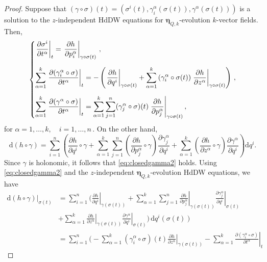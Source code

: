 \documentclass[10pt,a4paper]{amsart}
\newcommand{\dd}{\mathrm{d}}
\newcommand\restr[2]{\left.#1\right|_{#2}} \newcommand{\bfX}{\mathbf{X}} \newcommand{\bfY}{\mathbf{Y}} \newcommand{\bfZ}{\mathbf{Z}} \newcommand{\qeddiamond}{\hfill $\diamond$} \newcommand{\parder}[2]{\frac{\partial #1}{\partial #2}} \newcommand{\dparder}[2]{\dfrac{\partial #1}{\partial #2}} \newcommand{\tparder}[2]{\partial #1/\partial #2} \newcommand{\parderr}[3]{\frac{\partial^2 #1}{\partial #2\partial #3}} \newcommand{\dparderr}[3]{\dfrac{\partial^2 #1}{\partial #2\partial #3}} \newcommand{\tparderr}[3]{\partial^2 #1/\partial #2\partial #3}
\begin{document}
\begin{proof}
Suppose that $(\gamma \circ \sigma)(t) = (\sigma^i(t), \gamma_i^\alpha(\sigma(t)), \gamma^\alpha(\sigma(t)))$ is a solution to the $z$-independent HdDW equations for ${\bm \eta}_{Q,k}$-evolution  $k$-vector fields. Then,
\[
\begin{dcases}
\restr{\dfrac{\partial \sigma^i}{\partial t^\alpha}}{t} = \restr{\dfrac{\partial h}{\partial p_i^\alpha}}{\gamma\circ \sigma(t)}\,,\\[2mm]
\sum_{\alpha=1}^k \restr{\dfrac{\partial(\gamma_i^\alpha\circ \sigma)}{\partial t^\alpha}}{t}
=
-\left( \restr{\dfrac{\partial h}{\partial q^i}}{\gamma\circ \sigma(t)} + \sum_{\alpha=1}^k\left(\gamma_i^\alpha \circ \sigma(t) \right) \restr{\dfrac{\partial h}{\partial z^\alpha}}{\gamma\circ \sigma(t)}\right)\,,  \\[2mm]
\sum_{\alpha=1}^k \restr{\dfrac{\partial(\gamma^\alpha\circ \sigma)}{\partial t^\alpha}}{t}
=
\sum_{\alpha=1}^k\sum_{j=1}^n (\gamma^\alpha_j\circ \sigma)(t) \restr{\dfrac{\partial h}{\partial p_j^\alpha}}{\gamma\circ \sigma(t)},
\end{dcases}
\]
for $\alpha=1,\dotsc,k,\quad i=1,\dotsc,n\,.$ On the other hand,
\[
\dd(h \circ \gamma)
=
\sum_{i=1}^n\left( \frac{\partial h}{\partial q^i} \circ \gamma + \sum_{\alpha=1}^k\sum_{j=1}^n\left( \frac{\partial h}{\partial p_j^\alpha}\circ \gamma \right) \frac{\partial \gamma_j^\alpha}{\partial q^i} + \sum_{\alpha=1}^k\left( \frac{\partial h}{\partial z^\alpha}\circ \gamma \right) \frac{\partial \gamma^\alpha}{\partial q^i} \right) \dd q^i.
\]
Since $\gamma$ is holonomic, it follows that \eqref{eq:closedgamma2} holds.
Using \eqref{eq:closedgamma2} and the $z$-independent $\bm\eta_{Q,k}$-evolution HdDW equations, we have
\begin{align*}
\restr{\dd(h\circ \gamma)}{\sigma(t)}
&=
\sum_{i=1}^n
\Bigg(
  \restr{\frac{\partial h}{\partial q^i}}{\gamma(\sigma(t))}
  + \sum_{\alpha=1}^k \sum_{j=1}^n
    \restr{\frac{\partial h}{\partial p^\alpha_j}}{\gamma(\sigma(t))}
    \restr{\frac{\partial \gamma^\alpha_j}{\partial q^i}}{\sigma(t)}\\[1ex]&
  + \sum_{\alpha=1}^k
    \restr{\frac{\partial h}{\partial z^\alpha}}{\gamma(\sigma(t))}
    \restr{\frac{\partial \gamma^\alpha}{\partial q^i}}{\sigma(t)}
\Bigg)
\, \dd q^i(\sigma(t))
\\[1ex]
&=
\sum_{i=1}^n
\Bigg(
  - \sum_{\alpha=1}^k
    \left(\gamma_i^\alpha\circ \sigma\right)(t)
    \restr{\frac{\partial h}{\partial z^\alpha}}{\gamma(\sigma(t))}
  - \sum_{\alpha=1}^k
    \restr{\frac{\partial(\gamma_i^\alpha\circ\sigma)}{\partial t^\alpha}}{t}

\end{align*}
\end{proof}
\end{document}
